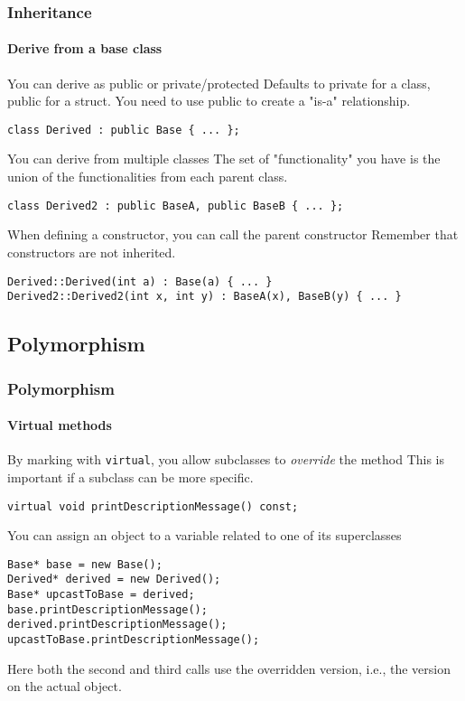 \begin{frame}
\frametitle{Inheritance}
\framesubtitle{Derive from a base class}

\begin{block}{You can derive as public or private/protected}
Defaults to private for a class, public for a struct. You need to use public to create a "is-a" relationship.

{\scriptsize 
\texttt{class Derived : public Base \{ ... \}; }
}
\end{block}
\pause
\begin{block}{You can derive from multiple classes}
The set of "functionality" you have is the union of the functionalities from each parent class.

{\scriptsize 
\texttt{class Derived2 : public BaseA, public BaseB \{ ... \}; }
}
\end{block}
\pause
\begin{block}{When defining a constructor, you can call the parent constructor}
Remember that constructors are not inherited.

\medskip

{\scriptsize 
\texttt{Derived::Derived(int a) : Base(a) \{ ... \} } \\
\texttt{Derived2::Derived2(int x, int y) : BaseA(x), BaseB(y) \{ ... \} }
}
\end{block}
\end{frame}

\subsection{Polymorphism}

\begin{frame}[fragile]
\frametitle{Polymorphism}
\framesubtitle{Virtual methods}

\begin{block}{By marking with \texttt{virtual}, you allow subclasses to {\em override} the method}
This is important if a subclass can be more specific.

{\scriptsize 
\texttt{virtual void printDescriptionMessage() const; }
}
\end{block}
\pause
\begin{block}{You can assign an object to a variable related to one of its superclasses}
{\scriptsize 
\begin{verbatim}
Base* base = new Base();
Derived* derived = new Derived();
Base* upcastToBase = derived;
base.printDescriptionMessage();
derived.printDescriptionMessage();
upcastToBase.printDescriptionMessage();
\end{verbatim}
}
Here both the second and third calls use the overridden version, i.e., the version on the actual object.
\end{block}

\end{frame}

